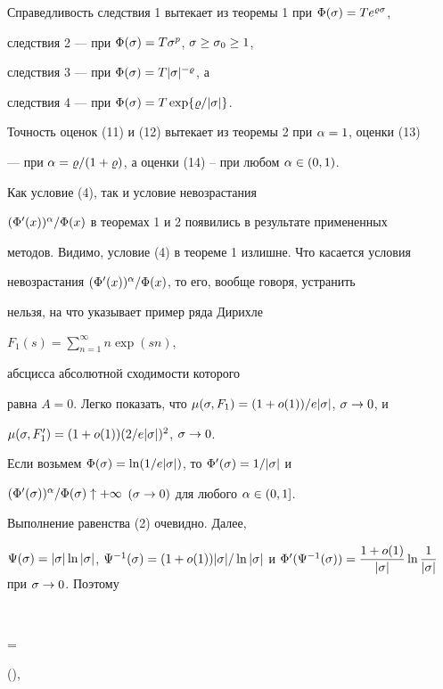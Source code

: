 Справедливость следствия 1 вытекает из теоремы 1 при $\Phi(\sigma)=Te^{\varrho\sigma}$,


следствия 2 --- при $\Phi(\sigma)=T\sigma^p$, $\sigma\ge\sigma_0\ge 1$,


следствия 3 --- при $\Phi(\sigma)=T|\sigma|^{-\varrho}$, а


следствия 4 --- при $\Phi(\sigma)=T\exp\{\varrho/|\sigma|\}$.


Точность оценок (11) и (12) вытекает из теоремы 2 при $\alpha=1$, оценки (13)


--- при $\alpha=\varrho/(1+\varrho)$, а оценки (14) -- при любом $\alpha\in(0,1)$.





\begin{note} Как условие (4), так и условие невозрастания


$(\Phi'(x))^{\alpha}/\Phi(x)$ в теоремах 1 и 2 появились в результате примененных


методов. Видимо, условие (4) в теореме 1 излишне. Что касается условия


невозрастания $(\Phi'(x))^{\alpha}/\Phi(x)$, то его, вообще говоря, устранить


нельзя, на что указывает пример ряда Дирихле 


$F_1(s)=\sum\limits_{n=1}^{\infty}n\exp(s n)$,


абсцисса абсолютной сходимости которого


равна $A=0$. Легко показать, что $\mu(\sigma,F_1)=(1+o(1))/e|\sigma|$, $\sigma\to 0$, и


$\mu(\sigma,F'_1)=(1+o(1))(2/e|\sigma|)^2$, $\sigma\to 0$. 


\end{note}





Если возьмем $\Phi(\sigma)=\ln(1/e|\sigma|)$, то $\Phi'(\sigma)=1/|\sigma|$ и


$(\Phi'(\sigma))^{\alpha}/\Phi(\sigma)\uparrow +\infty$ $(\sigma\to 0)$ для любого $\alpha\in (0,1]$.


Выполнение равенства (2) очевидно. Далее,


$\F(\s)=|\s|\ln|\s|$, $\F^{-1}(\s)=


(1+o(1))|\s|/\ln|\s|$ и $\Phi'(\F^{-1}(\s))=


\dfrac{1+o(1)}{|\s|}\ln \dfrac{1}{|\s|}$ при $\s\to 0$. Поэтому


$$


=


\quad(\s{}),


